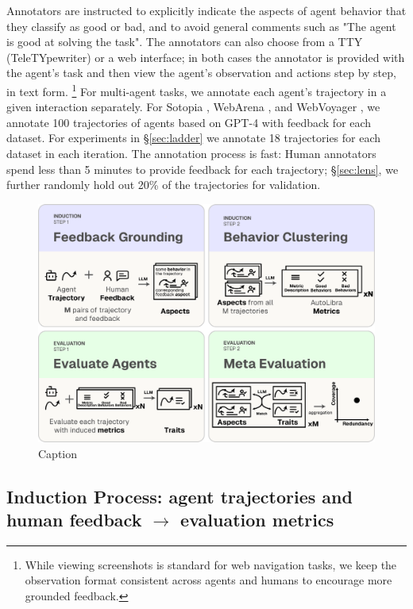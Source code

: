 Annotators are instructed to explicitly indicate the aspects of agent behavior that they classify as good or bad,
and to avoid general comments such as \textsf{"The agent is good at solving the task"}.
The annotators can also choose from a TTY (TeleTYpewriter) or a web interface; in both cases the annotator is provided with the agent's task
and then view the agent's observation and actions step by step, in text form. \footnote{While viewing screenshots is standard for web navigation tasks, we keep the observation format consistent across agents and humans to encourage more grounded feedback.}
For multi-agent tasks, we annotate each agent's trajectory in a given interaction separately. For Sotopia \citep{zhousotopia}, WebArena \citep{zhouwebarena},
and WebVoyager \citep{he2024webvoyager}, we annotate 100 trajectories of agents based on GPT-4 \citep{achiam2023gpt} with feedback for each dataset. For experiments in \S\ref{sec:ladder} we annotate 18 trajectories for each dataset in each
iteration. The annotation process is fast: Human annotators spend less than 5 minutes to provide feedback for each trajectory; \S\ref{sec:lens}, we further randomly hold out 20\% of the trajectories for validation.

\begin{figure}
    \centering
    \includegraphics[width=\linewidth]{figs/autolibra_pipeline_v2.pdf}
    \caption{Caption}
    \label{fig:enter-label}
\end{figure}

\subsection{Induction Process: agent trajectories and human feedback $\rightarrow$ evaluation metrics}
\label{sec:induction_process}

